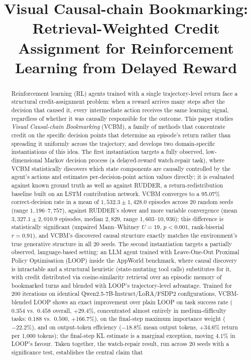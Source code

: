 \documentclass[conference]{IEEEtran}
\begin{document}
\title{Visual Causal-chain Bookmarking: Retrieval-Weighted Credit Assignment for Reinforcement Learning from Delayed Reward}

\author{
}

\maketitle

\begin{abstract}
Reinforcement learning (RL) agents trained with a single trajectory-level return face a structural credit-assignment problem: when a reward arrives many steps after the decision that caused it, every intermediate action receives the same learning signal, regardless of whether it was causally responsible for the outcome. This paper studies \emph{Visual Causal-chain Bookmarking} (VCBM), a family of methods that concentrate credit on the specific decision points that determine an episode's return rather than spreading it uniformly across the trajectory, and develops two domain-specific instantiations of this idea. The first instantiation targets a fully observed, low-dimensional Markov decision process (a delayed-reward watch-repair task), where VCBM statistically discovers which state components are causally controlled by the agent's actions and estimates per-decision-point action values directly; it is evaluated against known ground truth as well as against RUDDER, a return-redistribution baseline built on an LSTM contribution network. VCBM converges to a 95.07\% correct-decision rate in a mean of $1{,}532.3 \pm 1{,}428.0$ episodes across 20 random seeds (range $1{,}196$--$7{,}757$), against RUDDER's slower and more variable convergence (mean $3{,}327.1 \pm 2{,}010.9$ episodes, median $2{,}829$, range $1{,}603$--$10{,}936$); this difference is statistically significant (unpaired Mann--Whitney $U=19$, $p<0.001$, rank-biserial $r=0.91$), and VCBM's discovered causal structure exactly matches the environment's true generative structure in all 20 seeds. The second instantiation targets a partially observed, language-based setting: an LLM agent trained with Leave-One-Out Proximal Policy Optimisation (LOOP) inside the AppWorld benchmark, where causal discovery is intractable and a structural heuristic (state-mutating tool calls) substitutes for it, with credit distributed via cosine-similarity retrieval over an episodic memory of bookmarked turns and blended with LOOP's trajectory-level advantage. Trained for 200 iterations on identical Qwen2.5-7B-Instruct/LoRA/FSDP2 configurations, VCBM-blended LOOP shows an exact improvement over plain LOOP on task success rate ($0.354$ vs.\ $0.458$ overall, $+29.4\%$, concentrated almost entirely in medium-difficulty tasks: $0.188$ vs.\ $0.500$, $+166.7\%$), on the final-step maximum importance weight ($-22.2\%$), and on output-token efficiency ($-18.8\%$ mean output tokens, $+34.6\%$ return per 1{,}000 tokens); the final-step KL estimate is a marginal exception, moving $4.1\%$ in LOOP's favour. Taken together, the watch-repair result, run across 20 seeds with a significance test, establishes the central claim that 
\end{abstract}
\end{document}
